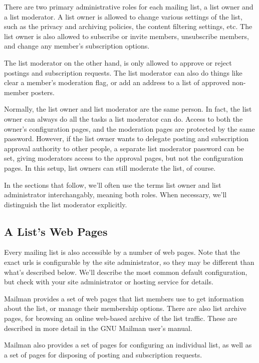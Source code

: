 \documentclass{howto}
\begin{document}
There are two primary administrative roles for each mailing list, a
list owner and a list moderator.  A list owner is allowed to change
various settings of the list, such as the privacy and archiving
policies, the content filtering settings, etc.  The list owner is also
allowed to subscribe or invite members, unsubscribe members, and
change any member's subscription options.

The list moderator on the other hand, is only allowed to approve or
reject postings and subscription requests.  The list moderator can
also do things like clear a member's moderation flag, or add an
address to a list of approved non-member posters.

Normally, the list owner and list moderator are the same person.  In
fact, the list owner can always do all the tasks a list moderator can
do.  Access to both the owner's configuration pages, and the
moderation pages are protected by the same password.  However, if the
list owner wants to delegate posting and subscription approval
authority to other people, a separate list moderator password can be
set, giving moderators access to the approval pages, but not the
configuration pages.  In this setup, list owners can still moderate
the list, of course.

In the sections that follow, we'll often use the terms list owner and
list administrator interchangably, meaning both roles.  When
necessary, we'll distinguish the list moderator explicitly.

\subsection{A List's Web Pages}

Every mailing list is also accessible by a number of web pages.  Note
that the exact urls is configurable by the site administrator, so they
may be different than what's described below.  We'll describe the most
common default configuration, but check with your site administrator
or hosting service for details.

Mailman provides a set of web pages that list members use to get
information about the list, or manage their membership options.  There
are also list archive pages, for browsing an online web-based archive
of the list traffic.  These are described in more detail in the GNU
Mailman user's manual.

Mailman also provides a set of pages for configuring an individual
list, as well as a set of pages for disposing of posting and
subscription requests.
\end{document}
